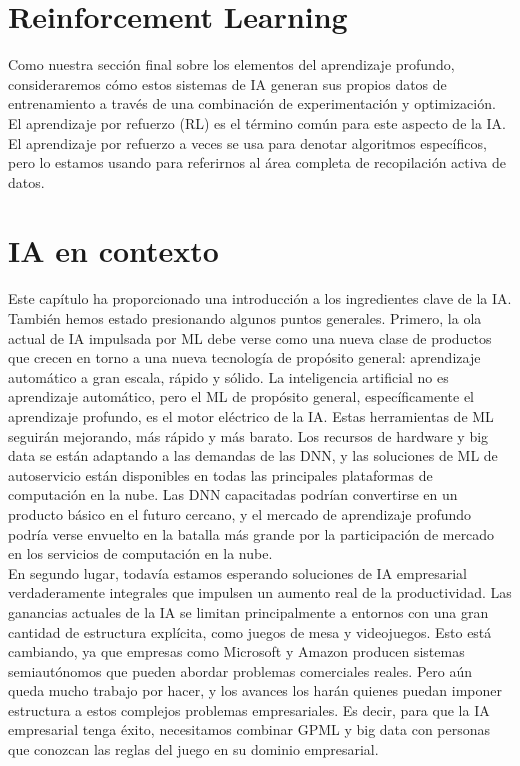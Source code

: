 \section{Reinforcement Learning}
Como nuestra sección final sobre los elementos del aprendizaje profundo, consideraremos cómo estos sistemas de IA generan sus propios datos de entrenamiento a través de una combinación de experimentación y optimización. El aprendizaje por refuerzo (RL) es el término común para este aspecto de la IA. El aprendizaje por refuerzo a veces se usa para denotar algoritmos específicos, pero lo estamos usando para referirnos al área completa de recopilación activa de datos.\\

\section{IA en contexto}
Este capítulo ha proporcionado una introducción a los ingredientes clave de la IA. También hemos estado presionando algunos puntos generales. Primero, la ola actual de IA impulsada por ML debe verse como una nueva clase de productos que crecen en torno a una nueva tecnología de propósito general: aprendizaje automático a gran escala, rápido y sólido. La inteligencia artificial no es aprendizaje automático, pero el ML de propósito general, específicamente el aprendizaje profundo, es el motor eléctrico de la IA. Estas herramientas de ML seguirán mejorando, más rápido y más barato. Los recursos de hardware y big data se están adaptando a las demandas de las DNN, y las soluciones de ML de autoservicio están disponibles en todas las principales plataformas de computación en la nube. Las DNN capacitadas podrían convertirse en un producto básico en el futuro cercano, y el mercado de aprendizaje profundo podría verse envuelto en la batalla más grande por la participación de mercado en los servicios de computación en la nube.\\
En segundo lugar, todavía estamos esperando soluciones de IA empresarial verdaderamente integrales que impulsen un aumento real de la productividad. Las ganancias actuales de la IA se limitan principalmente a entornos con una gran cantidad de estructura explícita, como juegos de mesa y videojuegos. Esto está cambiando, ya que empresas como Microsoft y Amazon producen sistemas semiautónomos que pueden abordar problemas comerciales reales. Pero aún queda mucho trabajo por hacer, y los avances los harán quienes puedan imponer estructura a estos complejos problemas empresariales. Es decir, para que la IA empresarial tenga éxito, necesitamos combinar GPML y big data con personas que conozcan las reglas del juego en su dominio empresarial.\\
